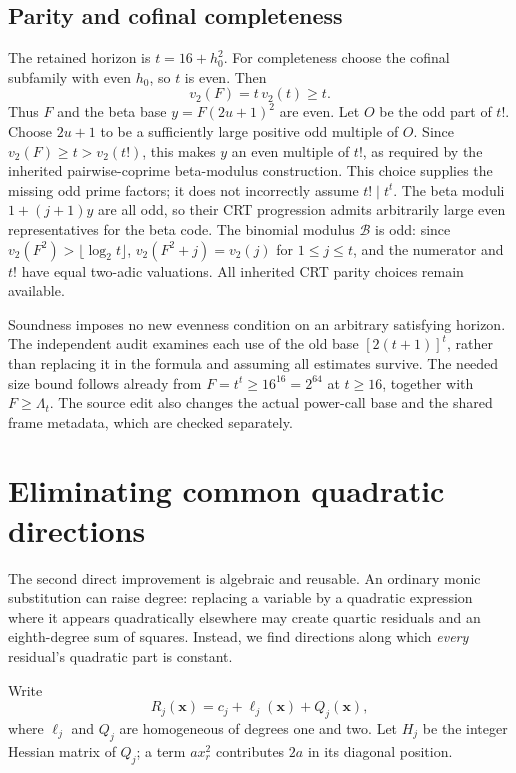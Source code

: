 \subsection{Parity and cofinal completeness}

The retained horizon is $t=16+h_0^2$. For completeness choose the
cofinal subfamily with even $h_0$, so $t$ is even. Then
\[
 v_2(F)=t\,v_2(t)\ge t.
\]
Thus $F$ and the beta base $y=F(2u+1)^2$ are even.
Let $O$ be the odd part of $t!$. Choose $2u+1$ to be a sufficiently
large positive odd multiple of $O$. Since $v_2(F)\ge t>v_2(t!)$,
this makes $y$ an even multiple of $t!$, as required by the inherited
pairwise-coprime beta-modulus construction. This choice supplies the
missing odd prime factors; it does not incorrectly assume $t!\mid t^t$.
The beta moduli $1+(j+1)y$ are all odd, so their CRT progression
admits arbitrarily large even representatives for the beta code.
The binomial modulus $\mathcal B$ is odd: since
$v_2(F^2)>\lfloor\log_2t\rfloor$,
$v_2(F^2+j)=v_2(j)$ for $1\le j\le t$, and the numerator and $t!$
have equal two-adic valuations. All inherited CRT parity choices
remain available.

Soundness imposes no new evenness condition on an arbitrary satisfying
horizon. The independent audit examines each use of the old base
$[2(t+1)]^t$, rather than replacing it in the formula and assuming
all estimates survive. The needed size bound follows already from
$F=t^t\ge16^{16}=2^{64}$ at $t\ge16$, together with
$F\ge\Lambda_t$. The source edit also changes the actual power-call
base and the shared frame metadata, which are checked separately.

\section{Eliminating common quadratic directions}\label{sec:radical}

The second direct improvement is algebraic and reusable. An ordinary
monic substitution can raise degree: replacing a variable by a quadratic
expression where it appears quadratically elsewhere may create quartic
residuals and an eighth-degree sum of squares. Instead, we find directions
along which \emph{every} residual's quadratic part is constant.

Write
\[
 R_j(\boldsymbol x)=c_j+\ell_j(\boldsymbol x)+Q_j(\boldsymbol x),
\]
where $\ell_j$ and $Q_j$ are homogeneous of degrees one and two.
Let $H_j$ be the integer Hessian matrix of $Q_j$; a term $a x_r^2$
contributes $2a$ in its diagonal position.

